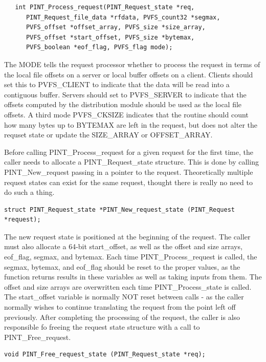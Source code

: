 \documentclass[12pt]{article} %
\begin{document}
\begin{verbatim}
   int PINT_Process_request(PINT_Request_state *req,
      PINT_Request_file_data *rfdata, PVFS_count32 *segmax,
      PVFS_offset *offset_array, PVFS_size *size_array,
      PVFS_offset *start_offset, PVFS_size *bytemax,
      PVFS_boolean *eof_flag, PVFS_flag mode);
\end{verbatim}

The MODE tells the request processor whether to process the
request in terms of the local file offsets on a server or local buffer
offsets on a client.  Clients should set this to PVFS\_CLIENT to
indicate that the data will be read into a contiguous buffer.  Servers
should set to PVFS\_SERVER to indicate that the offsets computed by the
distribution module should be used as the local file offsets.
A third mode PVFS\_CKSIZE indicates that the routine should count how
many bytes up to BYTEMAX are left in the request, but does not alter the
requset state or update the SIZE\_ARRAY or OFFSET\_ARRAY.

Before calling PINT\_Process\_request for a given request for the first
time, the caller needs to allocate a PINT\_Request\_state structure.
This is done by calling PINT\_New\_request passing in a pointer to the
request.  Theoretically multiple request states can exist for the same
request, thought there is really no need to do such a thing.

\begin{verbatim}
struct PINT_Request_state *PINT_New_request_state (PINT_Request *request);
\end{verbatim}

The new request state is positioned at the beginning of the request.
The caller must also allocate a 64-bit start\_offset, as well as
the offset and size arrays, eof\_flag, segmax, and bytemax.  Each time
PINT\_Process\_request is called, the segmax, bytemax, and eof\_flag
should be reset to the proper values, as the function returns results in
these variables as well as taking inputs from them.  The offset and size
arrays are overwritten each time PINT\_Process\_state is called.  The
start\_offset variable is normally NOT reset between calls - as the
caller normally wishes to continue translating the request from the
point left off previously.  After completing the processing of the
request, the caller is also responsible fo freeing the request state
structure with a call to PINT\_Free\_request.

\begin{verbatim}
void PINT_Free_request_state (PINT_Request_state *req);
\end{verbatim}
\end{document}
